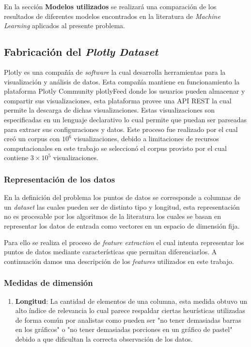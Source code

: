 \documentclass[a4paper,10pt,twocolumn]{article}
\begin{document}
	En la secci\'on \textbf{Modelos utilizados} se  realizar\'a una comparaci\'on de los resultados de diferentes modelos
	encontrados en la literatura de \textit{Machine Learning} aplicados al presente problema.





	\subsection{Fabricaci\'on del \textit{Plotly Dataset}}

	Plotly \cite{plotlyComp} es una compa\~n\'ia de \textit{software} la cual desarrolla
	herramientas para la visualizaci\'on y an\'alisis de datos. Esta compa\~n\'ia mantiene en
	funcionamiento la plataforma Plotly Community plotlyFeed \cite{plotlyFeed} donde los usuarios pueden almacenar y 
	compartir sus visualizaciones, esta plataforma provee una API REST \cite{plotlyApi} la cual permite la descarga
	de dichas visualizaciones. Estas visualizaciones son especificadas en un lenguaje declarativo lo cual permite que
	puedan ser parseadas para extraer sus configuraciones y datos. Este proceso fue realizado por
	\cite{hu2019vizml} el cual cre\'o un corpus con $10^6$ visualizaciones, debido a limitaciones
	de recursos computacionales en este trabajo se seleccion\'o el corpus provisto por \cite{li2021kg4vis} el cual
	contiene $3 \times 10^5$ visualizaciones.

	\subsubsection{Representaci\'on de los datos}

	En la definici\'on del problema los puntos de datos se corresponde a columnas de un
	\textit{dataset} las cuales pueden ser de distinto tipo y longitud, 
	esta representaci\'on no es procesable por los algoritmos de la literatura los cuales
	se basan en representar los datos de entrada como vectores en un espacio de dimensi\'on fija.

	Para ello se realiza el proceso de \textit{feature extraction} el cual intenta representar
	los puntos de datos mediante caracter\'isticas que permitan diferenciarlos. A continuaci\'on
	damos una descripci\'on de los \textit{features} utilizados en este trabajo.


	\subsubsection*{Medidas de dimensi\'on}
		\begin{enumerate}
			\item \textbf{Longitud}: La cantidad de elementos de una columna, esta medida obtuvo un
			alto \'indice de relevancia lo cual parece respaldar ciertas heur\'isticas 
			utilizadas de forma com\'un por analistas como pueden ser "no tener demasiadas barras en los gr\'aficos"
			o "no tener demasiadas porciones en un gr\'afico de pastel" debido a que dificultan
			la correcta observaci\'on de los datos.
		\end{enumerate} 
\end{document}
